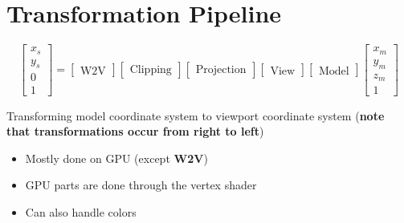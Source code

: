 \section{Transformation Pipeline}

  \begin{equation}
    \begin{bmatrix}
      x_{s} \\
      y_{s} \\
      0 \\
      1
    \end{bmatrix}
    =
    \begin{bmatrix}
      \text{W2V}
    \end{bmatrix}
    \begin{bmatrix}
      \text{Clipping}
    \end{bmatrix}
    \begin{bmatrix}
      \text{Projection}
    \end{bmatrix}
    \begin{bmatrix}
      \text{View}
    \end{bmatrix}
    \begin{bmatrix}
      \text{Model}
    \end{bmatrix}
    \begin{bmatrix}
      x_{m} \\
      y_{m} \\
      z_{m} \\
      1
    \end{bmatrix}
  \end{equation}

  Transforming model coordinate system to viewport coordinate system
  (\textbf{note that transformations occur from right to left})

  \begin{itemize}
    \item Mostly done on GPU (except \textbf{W2V})
    \item GPU parts are done through the vertex shader
    \item Can also handle colors
  \end{itemize}

